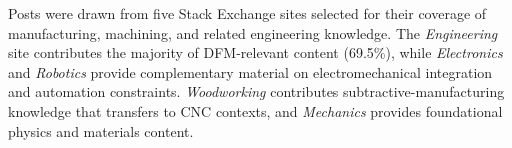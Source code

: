 Posts were drawn from five Stack Exchange sites selected for their
coverage of manufacturing, machining, and related engineering
knowledge.  The \emph{Engineering} site contributes the majority of
DFM-relevant content (69.5\%), while \emph{Electronics} and
\emph{Robotics} provide complementary material on electromechanical
integration and automation constraints.  \emph{Woodworking}
contributes subtractive-manufacturing knowledge that transfers to
CNC contexts, and \emph{Mechanics} provides foundational physics
and materials content.
